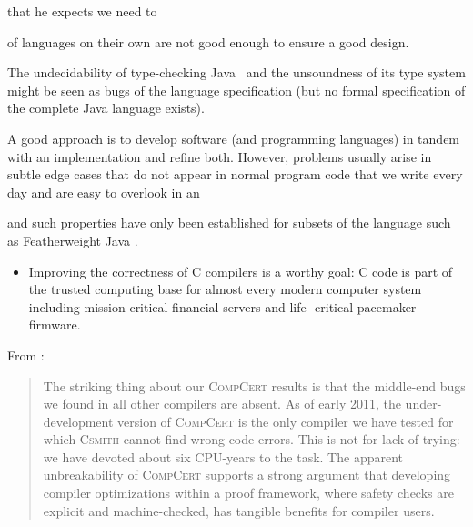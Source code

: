 {that he expects we need to

of languages on their own are not good enough to ensure a
good design.




The undecidability of type-checking Java~\cite{grigore2017} and the unsoundness
of its type system \cite{amin2016java} might be seen as bugs of the language
specification (but no formal specification of the complete Java language
exists).


A good approach is to develop software (and programming languages) in tandem
with an implementation and refine both. However, problems usually arise in
subtle edge cases that do not appear in normal program code that we write every
day and are easy to overlook in an





and such properties have only been established for subsets of the language such
as Featherweight Java \cite{igarashi2001featherweight}.

\begin{itemize}
\item
  Improving the correctness of C compilers is a worthy goal: C code is part of
  the trusted computing base for almost every modern computer system including
  mission-critical financial servers and life- critical pacemaker firmware.
\end{itemize}
From \cite{yang2011bugs}:

\blockquote{ The striking thing about our \textsc{CompCert} results is that the
  middle-end bugs we found in all other compilers are absent. As of early 2011,
  the under-development version of \textsc{CompCert} is the only compiler we
  have tested for which \textsc{Csmith} cannot find wrong-code errors. This is
  not for lack of trying: we have devoted about six CPU-years to the task. The
  apparent unbreakability of \textsc{CompCert} supports a strong argument that
  developing compiler optimizations within a proof framework, where safety
  checks are explicit and machine-checked, has tangible benefits for compiler
  users.}


}
